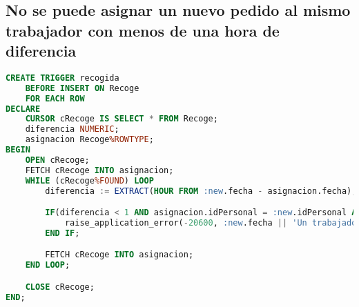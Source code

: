 \subsection{No se puede asignar un nuevo pedido al mismo trabajador con menos de una hora de diferencia}
\begin{lstlisting}[language=sql]
CREATE TRIGGER recogida
	BEFORE INSERT ON Recoge
	FOR EACH ROW
DECLARE
	CURSOR cRecoge IS SELECT * FROM Recoge;
	diferencia NUMERIC;
	asignacion Recoge%ROWTYPE;
BEGIN
	OPEN cRecoge;
	FETCH cRecoge INTO asignacion;
	WHILE (cRecoge%FOUND) LOOP
		diferencia := EXTRACT(HOUR FROM :new.fecha - asignacion.fecha);

		IF(diferencia < 1 AND asignacion.idPersonal = :new.idPersonal AND asignacion.año = :new.año) THEN
			raise_application_error(-20600, :new.fecha || 'Un trabajador no puede serle asignado un pedido con menos de 1 hora de diferencia');
		END IF;

		FETCH cRecoge INTO asignacion;
	END LOOP;

	CLOSE cRecoge;
END;
\end{lstlisting}
